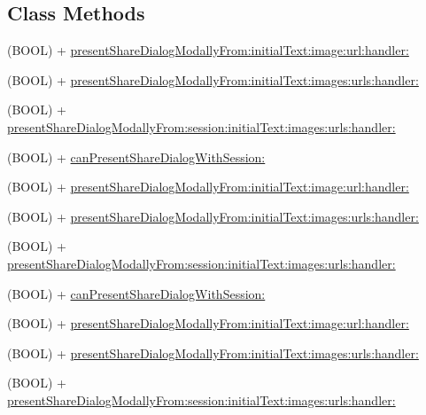 \subsection*{Class Methods}
\begin{DoxyCompactItemize}
\item 
(B\+O\+OL) + \hyperlink{interfaceFBNativeDialogs_a536cf508be27488381344840016d83a1}{present\+Share\+Dialog\+Modally\+From\+:initial\+Text\+:image\+:url\+:handler\+:}
\item 
(B\+O\+OL) + \hyperlink{interfaceFBNativeDialogs_a0b1838513861cd340a972af6cc612ca5}{present\+Share\+Dialog\+Modally\+From\+:initial\+Text\+:images\+:urls\+:handler\+:}
\item 
(B\+O\+OL) + \hyperlink{interfaceFBNativeDialogs_ac026f560c572059f42b7da1153e8e9cc}{present\+Share\+Dialog\+Modally\+From\+:session\+:initial\+Text\+:images\+:urls\+:handler\+:}
\item 
(B\+O\+OL) + \hyperlink{interfaceFBNativeDialogs_a8b8d5049303db38cf3f214e0367ea424}{can\+Present\+Share\+Dialog\+With\+Session\+:}
\item 
(B\+O\+OL) + \hyperlink{interfaceFBNativeDialogs_a536cf508be27488381344840016d83a1}{present\+Share\+Dialog\+Modally\+From\+:initial\+Text\+:image\+:url\+:handler\+:}
\item 
(B\+O\+OL) + \hyperlink{interfaceFBNativeDialogs_a0b1838513861cd340a972af6cc612ca5}{present\+Share\+Dialog\+Modally\+From\+:initial\+Text\+:images\+:urls\+:handler\+:}
\item 
(B\+O\+OL) + \hyperlink{interfaceFBNativeDialogs_ac026f560c572059f42b7da1153e8e9cc}{present\+Share\+Dialog\+Modally\+From\+:session\+:initial\+Text\+:images\+:urls\+:handler\+:}
\item 
(B\+O\+OL) + \hyperlink{interfaceFBNativeDialogs_a8b8d5049303db38cf3f214e0367ea424}{can\+Present\+Share\+Dialog\+With\+Session\+:}
\item 
(B\+O\+OL) + \hyperlink{interfaceFBNativeDialogs_a536cf508be27488381344840016d83a1}{present\+Share\+Dialog\+Modally\+From\+:initial\+Text\+:image\+:url\+:handler\+:}
\item 
(B\+O\+OL) + \hyperlink{interfaceFBNativeDialogs_a0b1838513861cd340a972af6cc612ca5}{present\+Share\+Dialog\+Modally\+From\+:initial\+Text\+:images\+:urls\+:handler\+:}
\item 
(B\+O\+OL) + \hyperlink{interfaceFBNativeDialogs_ac026f560c572059f42b7da1153e8e9cc}{present\+Share\+Dialog\+Modally\+From\+:session\+:initial\+Text\+:images\+:urls\+:handler\+:}
\item 

\end{DoxyCompactItemize}
